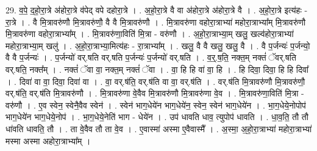 \documentclass[17pt]{extarticle}
\begin{document}
29. व॒पे॒ द॒हो॒रा॒त्रे अ॑होरा॒त्रे व॑पेद् वपे दहोरा॒त्रे । . अ॒हो॒रा॒त्रे वै वा अ॑होरा॒त्रे अ॑होरा॒त्रे वै । . अ॒हो॒रा॒त्रे इत्य॑हः - रा॒त्रे । . वै मि॒त्रावरु॑णौ मि॒त्रावरु॑णौ॒ वै वै मि॒त्रावरु॑णौ । . मि॒त्रावरु॑णा वहोरा॒त्राभ्या॑ महोरा॒त्राभ्या᳚म् मि॒त्रावरु॑णौ मि॒त्रावरु॑णा वहोरा॒त्राभ्या᳚म् । . मि॒त्रावरु॑णा॒विति॑ मि॒त्रा - वरु॑णौ । . अ॒हो॒रा॒त्राभ्या॒म् खलु॒ खल्व॑होरा॒त्राभ्या॑ महोरा॒त्राभ्या॒म् खलु॑ । . अ॒हो॒रा॒त्राभ्या॒मित्य॑हः - रा॒त्राभ्या᳚म् । . खलु॒ वै वै खलु॒ खलु॒ वै । . वै प॒र्जन्यः॑ प॒र्जन्यो॒ वै वै प॒र्जन्यः॑ । . प॒र्जन्यो॑ वर्.षति वर्.षति प॒र्जन्यः॑ प॒र्जन्यो॑ वर्.षति । . व॒र्॒.ष॒ति॒ नक्त॒म् नक्तं॑ ॅवर्.षति वर्.षति॒ नक्त᳚म् । . नक्तं॑ ॅवा वा॒ नक्त॒म् नक्तं॑ ॅवा । . वा॒ हि हि वा॑ वा॒ हि । . हि दिवा॒ दिवा॒ हि हि दिवा᳚ । . दिवा॑ वा वा॒ दिवा॒ दिवा॑ वा । . वा॒ वर्.ष॑ति॒ वर्.ष॑ति वा वा॒ वर्.ष॑ति । . वर्.ष॑ति मि॒त्रावरु॑णौ मि॒त्रावरु॑णौ॒ वर्.ष॑ति॒ वर्.ष॑ति मि॒त्रावरु॑णौ । . मि॒त्रावरु॑णा वे॒वैव मि॒त्रावरु॑णौ मि॒त्रावरु॑णा वे॒व । . मि॒त्रावरु॑णा॒विति॑ मि॒त्रा - वरु॑णौ । . ए॒व स्वेन॒ स्वेनै॒वैव स्वेन॑ । . स्वेन॑ भाग॒धेये॑न भाग॒धेये॑न॒ स्वेन॒ स्वेन॑ भाग॒धेये॑न । . भा॒ग॒धेये॒नोपोप॑ भाग॒धेये॑न भाग॒धेये॒नोप॑ । . भा॒ग॒धेये॒नेति॑ भाग - धेये॑न । . उप॑ धावति धाव॒ त्युपोप॑ धावति । . धा॒व॒ति॒ तौ तौ धा॑वति धावति॒ तौ । . ता वे॒वैव तौ ता वे॒व । . ए॒वास्मा॑ अस्मा ए॒वैवास्मै᳚ । . अ॒स्मा॒ अ॒हो॒रा॒त्राभ्या॑ महोरा॒त्राभ्या॑ मस्मा अस्मा अहोरा॒त्राभ्या᳚म् । \newline
\end{document}
